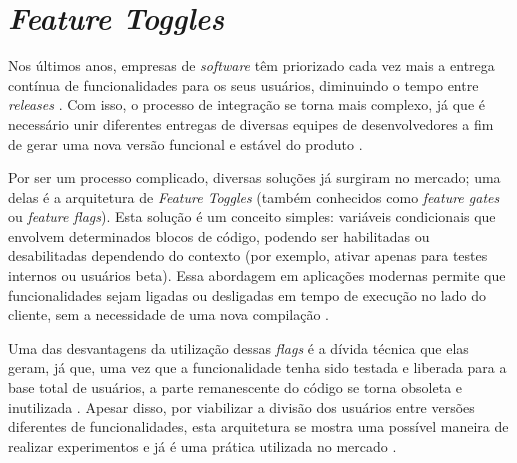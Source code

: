\section{\textit{Feature Toggles}}
\label{sec:ref-feature-toggle}

Nos últimos anos, empresas de \textit{software} têm priorizado cada vez mais a entrega contínua de funcionalidades para os seus usuários, diminuindo o tempo entre \textit{releases} \cite{humble_farley_2010}. Com isso, o processo de integração se torna mais complexo, já que é necessário unir diferentes entregas de diversas equipes de desenvolvedores a fim de gerar uma nova versão funcional e estável do produto \cite{berczuk_appleton_2002}.

Por ser um processo complicado, diversas soluções já surgiram no mercado; uma delas é a arquitetura de \textit{Feature Toggles} (também conhecidos como \textit{feature gates} ou \textit{feature flags}). Esta solução é um conceito simples: variáveis condicionais que envolvem determinados blocos de código, podendo ser habilitadas ou desabilitadas dependendo do contexto (por exemplo, ativar apenas para testes internos ou usuários beta). Essa abordagem em aplicações modernas permite que funcionalidades sejam ligadas ou desligadas em tempo de execução no lado do cliente, sem a necessidade de uma nova compilação \cite{rahman_feature_toggle_2016}.

Uma das desvantagens da utilização dessas \textit{flags} é a dívida técnica que elas geram, já que, uma vez que a funcionalidade tenha sido testada e liberada para a base total de usuários, a parte remanescente do código se torna obsoleta e inutilizada \cite{rahman_feature_toggle_2016}. Apesar disso, por viabilizar a divisão dos usuários entre versões diferentes de funcionalidades, esta arquitetura se mostra uma possível maneira de realizar experimentos e já é uma prática utilizada no mercado \cite{issa_mattos_hurrier_2023}.
